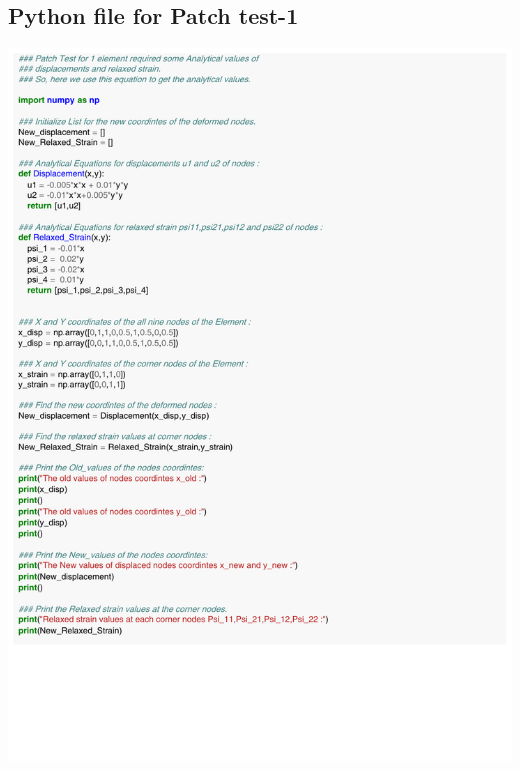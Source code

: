 \documentclass[12pt]{article}
\begin{document}
\begin{appendices}
\section{Python file for Patch test-1}
\includegraphics[scale=0.93,page=1]{Patch_test_1_elem_eqn.pdf}
\newpage

\end{appendices}
\end{document}
